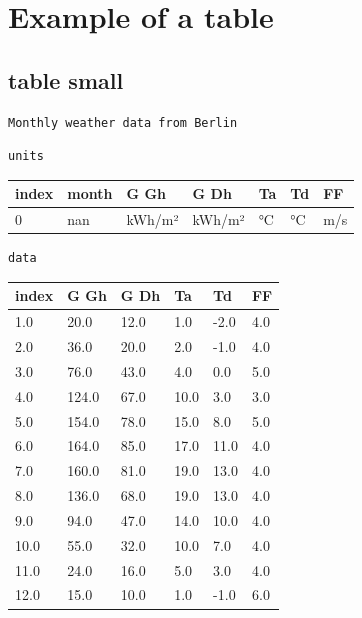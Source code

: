 \documentclass[reprint, floatfix, groupaddress, prb]{article}
\newcommand{\prompt}[4]{
        \ttfamily\llap{{\color{#2}[#3]:\hspace{3pt}#4}}\vspace{-\baselineskip}
    }
\begin{document}
    \hypertarget{example-of-a-table}{%
\section{Example of a table}\label{example-of-a-table}}

    \hypertarget{table-small}{%
\subsection{table small}\label{table-small}}

    \begin{Verbatim}[commandchars=\\\{\}]
Monthly weather data from Berlin
    \end{Verbatim}

    \begin{Verbatim}[commandchars=\\\{\}]
units
    \end{Verbatim}
 
            
\prompt{Out}{outcolor}{8}{}
    
    \begin{table}[ht] 
\begin{tabular}[l]{lllllll}
\toprule
index & month & G Gh & G Dh & Ta & Td & FF\\ 
\midrule
0 & nan & kWh/m² & kWh/m² & °C & °C & m/s\\ 
\bottomrule 
 \end{tabular}
\end{table}

    

    \begin{Verbatim}[commandchars=\\\{\}]
data
    \end{Verbatim}
 
            
\prompt{Out}{outcolor}{9}{}
    
    \begin{table}[ht] 
\begin{tabular}[l]{llllll}
\toprule
index & G Gh & G Dh & Ta & Td & FF\\ 
\midrule
1.0 & 20.0 & 12.0 & 1.0 & -2.0 & 4.0\\ 
2.0 & 36.0 & 20.0 & 2.0 & -1.0 & 4.0\\ 
3.0 & 76.0 & 43.0 & 4.0 & 0.0 & 5.0\\ 
4.0 & 124.0 & 67.0 & 10.0 & 3.0 & 3.0\\ 
5.0 & 154.0 & 78.0 & 15.0 & 8.0 & 5.0\\ 
6.0 & 164.0 & 85.0 & 17.0 & 11.0 & 4.0\\ 
7.0 & 160.0 & 81.0 & 19.0 & 13.0 & 4.0\\ 
8.0 & 136.0 & 68.0 & 19.0 & 13.0 & 4.0\\ 
9.0 & 94.0 & 47.0 & 14.0 & 10.0 & 4.0\\ 
10.0 & 55.0 & 32.0 & 10.0 & 7.0 & 4.0\\ 
11.0 & 24.0 & 16.0 & 5.0 & 3.0 & 4.0\\ 
12.0 & 15.0 & 10.0 & 1.0 & -1.0 & 6.0\\ 
\bottomrule 
 \end{tabular}
\end{table}
\end{document}
